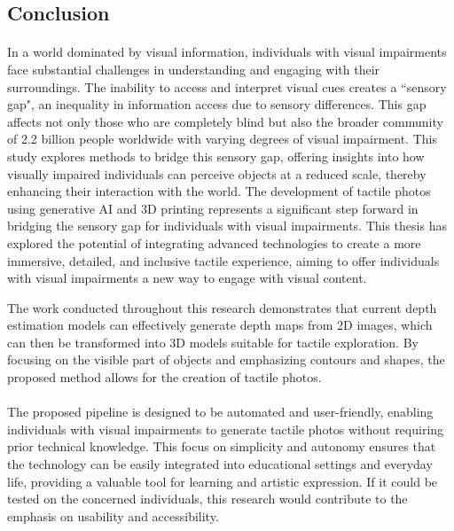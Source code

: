 \documentclass[12pt, letterpaper]{article}
\begin{document}
\begin{spacing}{1.15}
\newpage

\section{Conclusion}
\paragraph{}

In a world dominated by visual information, individuals with visual impairments face substantial challenges in understanding and engaging with their surroundings.
The inability to access and interpret visual cues creates a ``sensory gap", an inequality in information access due to sensory differences. This gap affects not
only those who are completely blind but also the broader community of 2.2 billion people worldwide with varying degrees of visual impairment. This study explores
methods to bridge this sensory gap, offering insights into how visually impaired individuals can perceive objects at a reduced scale, thereby enhancing their
interaction with the world.
The development of tactile photos using generative AI and 3D printing represents a significant step forward in bridging the sensory gap for individuals with
visual impairments. This thesis has explored the potential of integrating advanced technologies to create a more immersive, detailed, and inclusive tactile experience,
aiming to offer individuals with visual impairments a new way to engage with visual content.

The work conducted throughout this research demonstrates that current depth estimation models can effectively generate depth maps from 2D images, which can
then be transformed into 3D models suitable for tactile exploration. By focusing on the visible part of objects and emphasizing contours and shapes, the proposed
method allows for the creation of tactile photos.
\paragraph{}
The proposed pipeline is designed to be automated and user-friendly, enabling individuals with visual impairments to generate tactile photos without
requiring prior technical knowledge. This focus on simplicity and autonomy ensures that the technology can be easily integrated into educational
settings and everyday life, providing a valuable tool for learning and artistic expression. If it could be tested on the concerned individuals,
this research would contribute to the emphasis on usability and accessibility. 

\end{spacing}
\end{document}
